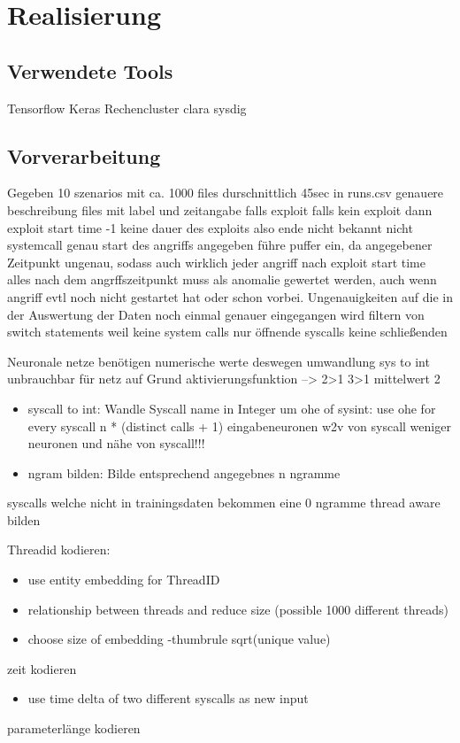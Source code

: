 
\chapter{Realisierung}\label{ch:realisierung}
    \section{Verwendete Tools}
        Tensorflow Keras
        Rechencluster clara
        sysdig

\section{Vorverarbeitung}

Gegeben 10 szenarios mit ca. 1000 files durschnittlich 45sec
in runs.csv genauere beschreibung files mit label und zeitangabe falls exploit
falls kein exploit dann exploit start time -1
keine dauer des exploits also ende nicht bekannt 
nicht systemcall genau start des angriffs angegeben 
führe puffer ein, da angegebener Zeitpunkt ungenau, sodass auch wirklich jeder angriff nach exploit start time
alles nach dem angrffszeitpunkt muss als anomalie gewertet werden, auch wenn angriff evtl noch nicht gestartet hat oder schon vorbei.
Ungenauigkeiten auf die in der Auswertung der Daten noch einmal genauer eingegangen wird
filtern von switch statements weil keine system calls
nur öffnende syscalls keine schließenden

Neuronale netze benötigen numerische werte deswegen umwandlung
sys to int unbrauchbar für netz auf Grund aktivierungsfunktion --> 2>1 3>1 mittelwert 2
\begin{itemize}
    \item syscall to int: Wandle Syscall name in Integer um
    \subitem ohe of sysint: use ohe for every syscall 
     n * (distinct calls + 1) eingabeneuronen 
    \subitem w2v von syscall
     weniger neuronen und nähe von syscall!!!
    \item ngram bilden: Bilde entsprechend angegebnes n ngramme 
\end{itemize}

syscalls welche nicht in trainingsdaten bekommen eine 0
ngramme thread aware bilden

Threadid kodieren: 
\begin{itemize}
    \item use entity embedding for ThreadID \cite{GUO2016} 
    \item relationship between threads and reduce size (possible 1000 different threads)
    \item choose size of embedding -thumbrule sqrt(unique value) 
\end{itemize}
zeit kodieren
\begin{itemize}
    \item use time delta of two different syscalls as new input
\end{itemize}
parameterlänge kodieren

